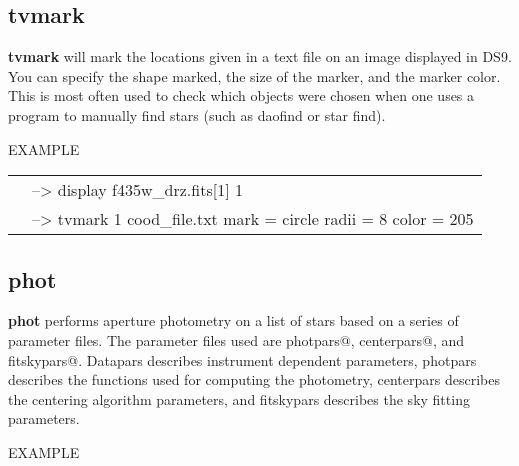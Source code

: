 \subsection{{\bf tvmark}}
{\bf tvmark} will mark the locations given in a text file on an image displayed in DS9. You can specify the shape marked, the size of the marker, and the marker color. This is most often used to check which objects were chosen when one uses a program to manually find stars (such as daofind or star find). 

EXAMPLE

\begin{minipage}{5.0in}
\begin{tabular}{ll}
& {\color{RoyalBlue}--> display f435w\_drz.fits[1] 1} \\
&{\color{RoyalBlue} --> tvmark 1 cood\_file.txt mark = circle  radii = 8 color = 205} \\
\end{tabular}
\end{minipage}
\subsection{{\bf phot}}
{\bf phot} performs aperture photometry on a list of stars based on a series of parameter files. The parameter files used are photpars@, centerpars@, and fitskypars@. Datapars describes instrument dependent parameters, photpars describes the functions used for computing the photometry, centerpars describes the centering algorithm parameters, and  fitskypars describes the sky fitting parameters.

EXAMPLE


